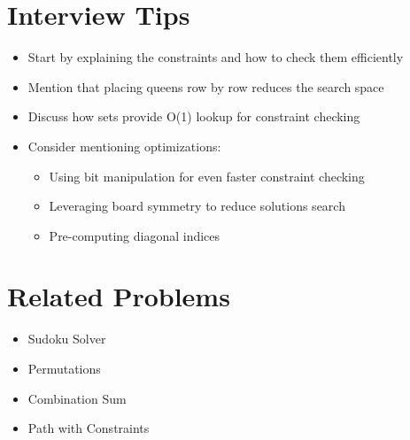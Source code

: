 \section*{Interview Tips}
\begin{itemize}
    \item Start by explaining the constraints and how to check them efficiently
    \item Mention that placing queens row by row reduces the search space
    \item Discuss how sets provide O(1) lookup for constraint checking
    \item Consider mentioning optimizations:
        \begin{itemize}
            \item Using bit manipulation for even faster constraint checking
            \item Leveraging board symmetry to reduce solutions search
            \item Pre-computing diagonal indices
        \end{itemize}
\end{itemize}

\section*{Related Problems}
\begin{itemize}
    \item Sudoku Solver
    \item Permutations
    \item Combination Sum
    \item Path with Constraints
\end{itemize}

\printindex